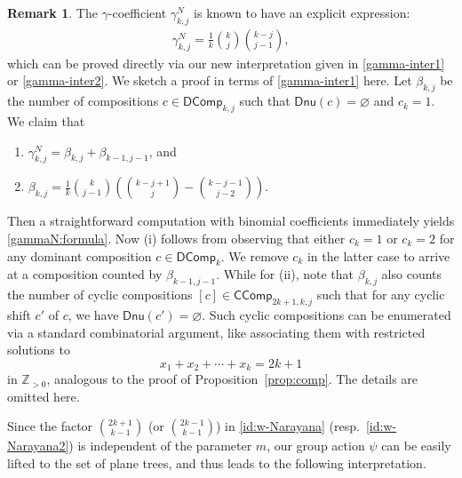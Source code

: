 \documentclass[reqno]{amsart}
\numberwithin{equation}{section}
\theoremstyle{definition}
\newtheorem{remark}{Remark}[section]
\theoremstyle{named}
\newcommand{\bZ}{\mathbb{Z}}
\def\CComp{\mathsf{CComp}}
\def\DComp{\mathsf{DComp}}
\def\Dnu{\mathsf{Dnu}}
\begin{document}
\begin{remark}
The $\gamma$-coefficient $\gamma^N_{k,j}$ is known to have an explicit expression:
\begin{align}\label{gammaN:formula}
\gamma^N_{k,j}=\frac{1}{k}\binom{k}{j}\binom{k-j}{j-1},
\end{align}
which can be proved directly via our new interpretation given in \eqref{gamma-inter1} or \eqref{gamma-inter2}. We sketch a proof in terms of \eqref{gamma-inter1} here. Let $\beta_{k,j}$ be the number of compositions $c\in\DComp_{k,j}$ such that $\Dnu(c)=\varnothing$ and $c_k=1$. We claim that
\begin{enumerate}
	\item $\gamma^N_{k,j}=\beta_{k,j}+\beta_{k-1,j-1}$, and
	\item $\beta_{k,j}=\frac{1}{k}\binom{k}{j-1}\left(\binom{k-j+1}{j}-\binom{k-j-1}{j-2}\right)$.
\end{enumerate}
Then a straightforward computation with binomial coefficients immediately yields \eqref{gammaN:formula}. Now (i) follows from observing that either $c_k=1$ or $c_k=2$ for any dominant composition $c\in\DComp_k$. We remove $c_k$ in the latter case to arrive at a composition counted by $\beta_{k-1,j-1}$. While for (ii), note that $\beta_{k,j}$ also counts the number of cyclic compositions $[c]\in\CComp_{2k+1,k,j}$ such that for any cyclic shift $c'$ of $c$, we have $\Dnu(c')=\varnothing$. Such cyclic compositions can be enumerated via a standard combinatorial argument, like associating them with restricted solutions to
$$x_1+x_2+\cdots+x_k=2k+1$$
in $\bZ_{>0}$, analogous to the proof of Proposition~\ref{prop:comp}. The details are omitted here.
\end{remark}










Since the factor $\binom{2k+1}{k-1}$ (or $\binom{2k-1}{k-1}$) in \eqref{id:w-Narayana} (resp.~\eqref{id:w-Narayana2}) is independent of the parameter $m$, our group action $\psi$ can be easily lifted to the set of plane trees, and thus leads to the following interpretation. 
\end{document}

